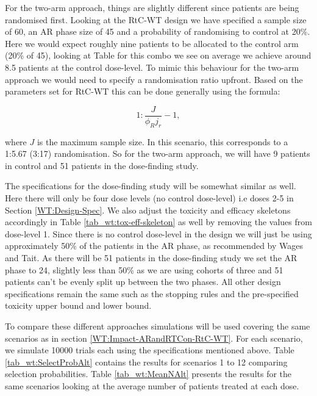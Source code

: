  For the two-arm approach, things are slightly different since patients are being randomised first. Looking at the RtC-WT design we have specified a sample size of 60, an AR phase size of 45 and a probability of randomising to control at 20\%. Here we would expect roughly nine patients to be allocated to the control arm (20\% of 45), looking at Table for this combo we see on average we achieve around 8.5 patients at the control dose-level. To mimic this behaviour for the two-arm approach we would need to specify a randomisation ratio upfront. Based on the parameters set for RtC-WT this can be done generally using the formula:
 
 \begin{equation}
 1 : \frac{J}{\phi_R j_r} - 1,
 \end{equation}
 
 where $J$ is the maximum sample size. In this scenario, this corresponds to a 1:5.67 (3:17) randomisation. So for the two-arm approach, we will have 9 patients in control and 51 patients in the dose-finding study. 
 
 The specifications for the dose-finding study will be somewhat similar as well. Here there will only be four dose levels (no control dose-level) i.e doses 2-5 in Section \ref{WT:Design-Spec}. We also adjust the toxicity and efficacy skeletons accordingly in Table \ref{tab_wt:tox-eff-skeleton} as well by removing the values from dose-level 1. Since there is no control dose-level in the design we will just be using approximately 50\% of the patients in the AR phase, as recommended by Wages and Tait. As there will be 51 patients in the dose-finding study we set the AR phase to 24, slightly less than 50\% as we are using cohorts of three and 51 patients can't be evenly split up between the two phases. All other design specifications remain the same such as the stopping rules and the pre-specified toxicity upper bound and lower bound. 
 
 To compare these different approaches simulations will be used covering the same scenarios as in section \ref{WT:Impact-ARandRTCon-RtC-WT}. For each scenario, we simulate 10000 trials each using the specifications mentioned above. Table \ref{tab_wt:SelectProbAlt} contains the results for scenarios 1 to 12 comparing selection probabilities. Table \ref{tab_wt:MeanNAlt} presents the results for the same scenarios looking at the average number of patients treated at each dose.  
 

